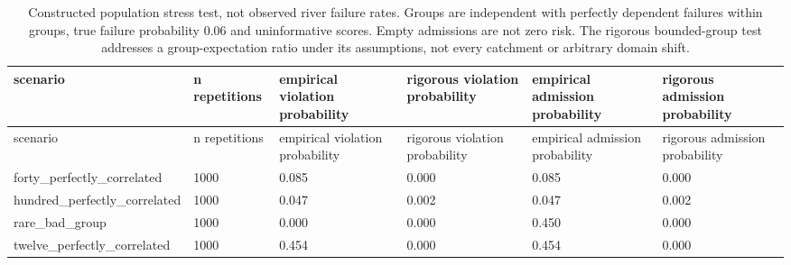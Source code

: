 {\tabletext
\setlength{\tabcolsep}{3pt}
\begin{longtable}{p{}p{}p{}p{}p{}p{}}
\caption{Constructed population stress test, not observed river failure rates. Groups are independent with perfectly dependent failures within groups, true failure probability 0.06 and uninformative scores. Empty admissions are not zero risk. The rigorous bounded-group test addresses a group-expectation ratio under its assumptions, not every catchment or arbitrary domain shift.}\label{tab:r3si-risk_stress}\\
\toprule
scenario & n repetitions & empirical violation probability & rigorous violation probability & empirical admission probability & rigorous admission probability \\
\midrule
\endfirsthead
\toprule
scenario & n repetitions & empirical violation probability & rigorous violation probability & empirical admission probability & rigorous admission probability \\
\midrule
\endhead
forty\_\allowbreak perfectly\_\allowbreak correlated & 1000 & 0.085 & 0.000 & 0.085 & 0.000 \\
hundred\_\allowbreak perfectly\_\allowbreak correlated & 1000 & 0.047 & 0.002 & 0.047 & 0.002 \\
rare\_\allowbreak bad\_\allowbreak group & 1000 & 0.000 & 0.000 & 0.450 & 0.000 \\
twelve\_\allowbreak perfectly\_\allowbreak correlated & 1000 & 0.454 & 0.000 & 0.454 & 0.000 \\
\bottomrule
\end{longtable}
}

